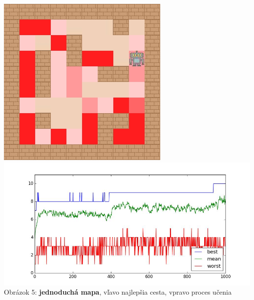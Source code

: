 \documentclass[10pt]{paper}
\begin{document}
\begin{center}
  \vspace{10em}\includegraphics[scale=0.4]{strategy2_simple.png} 
  \includegraphics[scale=0.3]{strategy2_simple_graph.png} \\
   Obrázok 5: \textbf{jednoduchá mapa}, vľavo najlepšia cesta, vpravo proces učenia
     \end{center}
     
\end{document}
